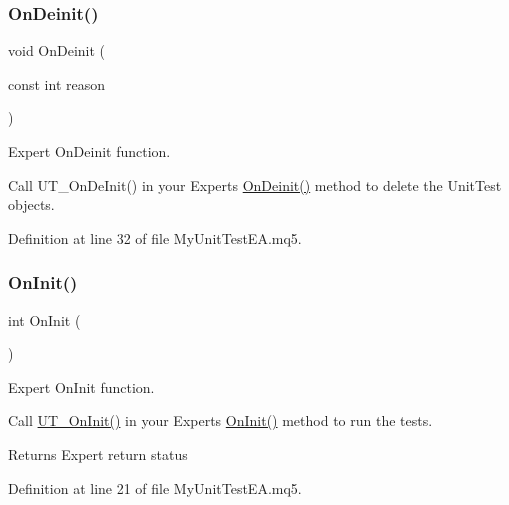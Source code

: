 \subsubsection{\texorpdfstring{On\+Deinit()}{OnDeinit()}}
{\footnotesize\ttfamily void On\+Deinit (\begin{DoxyParamCaption}\item[{const int}]{reason }\end{DoxyParamCaption})}



Expert On\+Deinit function. 

Call U\+T\+\_\+\+On\+De\+Init() in your Expert\textquotesingle{}s \mbox{\hyperlink{_my_unit_test_e_a_8mq5_a3f95d0fb3935a6dd3f45618a48fea55b}{On\+Deinit()}} method to delete the Unit\+Test objects. 

Definition at line 32 of file My\+Unit\+Test\+E\+A.\+mq5.

\mbox{\label{_my_unit_test_e_a_8mq5_a53dc1cd6aabfadddd579c1b1010e7d52}} 
\subsubsection{\texorpdfstring{On\+Init()}{OnInit()}}
{\footnotesize\ttfamily int On\+Init (\begin{DoxyParamCaption}{ }\end{DoxyParamCaption})}



Expert On\+Init function. 

Call \mbox{\hyperlink{_m_t_unit_8mqh_a9cdc57544d91884fab6f627b3394326f}{U\+T\+\_\+\+On\+Init()}} in your Expert\textquotesingle{}s \mbox{\hyperlink{_my_unit_test_e_a_8mq5_a53dc1cd6aabfadddd579c1b1010e7d52}{On\+Init()}} method to run the tests. \begin{DoxyReturn}{Returns}
Expert return status 
\end{DoxyReturn}


Definition at line 21 of file My\+Unit\+Test\+E\+A.\+mq5.

\mbox{\label{_my_unit_test_e_a_8mq5_a94383cb2b73d2bc8d5536e293232374f}} 
